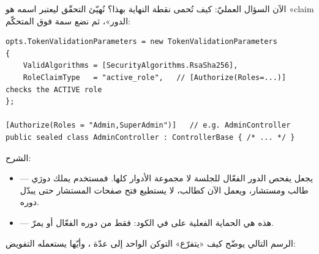 الآن السؤال العمليّ: كيف تُحمى نقطة النهاية بهذا؟ نُهيّئ التحقّق ليعتبر 
اسمه  هو «claim الدور»، ثم نضع سمة \code{[Authorize(Roles=...)]}
فوق المتحكّم:

\begin{english}
\begin{lstlisting}[language={[Sharp]C}]
opts.TokenValidationParameters = new TokenValidationParameters
{
    ValidAlgorithms = [SecurityAlgorithms.RsaSha256],
    RoleClaimType   = "active_role",   // [Authorize(Roles=...)] checks the ACTIVE role
};

[Authorize(Roles = "Admin,SuperAdmin")]   // e.g. AdminController
public sealed class AdminController : ControllerBase { /* ... */ }
\end{lstlisting}
\end{english}

الشرح:
\begin{itemize}
\item {} — يجعل \code{[Authorize(Roles=...)]}
  يفحص الدور الفعّال للجلسة لا مجموعة الأدوار كلها. فمستخدم يملك دورَي طالب ومستشار،
  ويعمل الآن كطالب، لا يستطيع فتح صفحات المستشار حتى يبدّل دوره.
\item \code{[Authorize(Roles = "Admin,SuperAdmin")]} — هذه هي الحماية الفعلية على
   في الكود: فقط من دوره الفعّال  أو
   يمرّ.
\end{itemize}

الرسم التالي يوضّح كيف «يتفرّع» التوكن الواحد إلى عدّة ، وأيّها يستعمله
التفويض:

\begin{center}\begin{LTR}
\end{LTR}\end{center}


